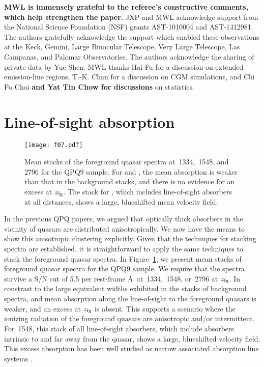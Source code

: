 \documentclass[iop]{emulateapj}
\begin{document}
\acknowledgements

{\bf MWL is immensely grateful to the referee's constructive comments, which help strengthen the
paper.}
JXP and MWL acknowledge support from the National Science Foundation (NSF) grants AST-1010004 and
AST-1412981. The authors gratefully acknowledge the support which enabled these observations at
the Keck, Gemini, Large Binocular Telescope, Very Large Telescope, Las Campanas, and Palomar
Observatories. The authors acknowledge the sharing of private data by Yue Shen. MWL thanks Hai Fu
for a discussion on extended emission-line regions, T.-K. Chan for a discussion on CGM
simulations, and Chi Po Choi {\bf and Yat Tin Chow for discussions} on statistics.

\appendix

\section{Line-of-sight absorption}
\label{sec:appendix}

\begin{figure}
\texttt{[image: f07.pdf]}
\caption{Mean stacks of the foreground quasar spectra at \,1334, \,1548, and
\,2796 for the QPQ9 sample. For  and , the mean absorption is
weaker than that in the background stacks, and there is no evidence for an excess at $z_{\rm fg}$.
The stack for , which includes line-of-sight absorbers at all distances, shows a large,
blueshifted mean velocity field.
}
\label{fig:stacks_fg}
\end{figure}

In the previous QPQ papers, we argued that optically thick absorbers in the vicinity of quasars
are distributed anisotropically. We now have the means to show this anisotropic clustering
explicitly. Given that the techniques for stacking spectra are established, it is straightforward
to apply the same techniques to stack the foreground quasar spectra. In
Figure~\ref{fig:stacks_fg}, we present mean stacks of foreground quasar spectra for
the QPQ9 sample. We require that the spectra survive a S/N cut of 5.5 per rest-frame \AA\ at
\,1334, \,1548, or \,2796 at $z_{\rm fg}$. In constrast to the
large equivalent widths exhibited in the stacks of background spectra,  and 
mean absorption along the line-of-sight to the foreground quasars is weaker, and an excess at
$z_{\rm fg}$ is absent. This supports a scenario where the ionizing radiation of the foreground
quasars are anisotropic and/or intermittent. For \,1548, this stack of all line-of-sight
absorbers, which include absorbers intrinsic to and far away from the quasar, shows a large,
blueshifted velocity field. This excess  absorption has been well studied as narrow
associated absorption line systems \citep[e.g., ][]{Wild+08}.
\end{document}
